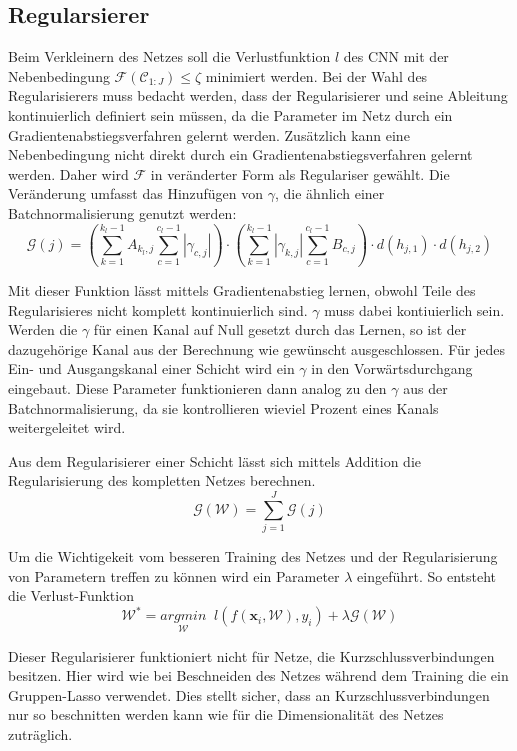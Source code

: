 \subsection{Regularsierer}
Beim Verkleinern des Netzes soll die Verlustfunktion $l$ des CNN mit der Nebenbedingung $\mathcal{F}(\mathcal{C}_{1:J})\leq \zeta$ minimiert werden. Bei der Wahl des Regularisierers muss bedacht werden, dass der Regularisierer und seine Ableitung kontinuierlich definiert sein müssen, da die Parameter im Netz durch ein Gradientenabstiegsverfahren gelernt werden. Zusätzlich kann eine Nebenbedingung nicht direkt durch ein Gradientenabstiegsverfahren gelernt werden. Daher wird $\mathcal{F}$ in veränderter Form als Regulariser gewählt. Die Veränderung umfasst das Hinzufügen von $\gamma$, die ähnlich einer Batchnormalisierung genutzt werden:
\begin{equation}
\mathcal{G}(j)=\left(\sum_{k=1}^{k_l-1} A_{k_l,j} \sum_{c=1}^{c_l-1} |\gamma_{c, j} | \right) \cdot \left(\sum_{k=1}^{k_l-1} |\gamma_{k,j} |   \sum_{c=1}^{c_l-1} B_{c,j}\right) \cdot d(h_{j,1}) \cdot d(h_{j,2})  
\end{equation}

Mit dieser Funktion lässt mittels Gradientenabstieg lernen, obwohl Teile des Regularisieres nicht komplett kontinuierlich sind. $\gamma$ muss dabei kontiuierlich sein. Werden die $\gamma$ für einen Kanal auf Null gesetzt durch das Lernen, so ist der dazugehörige Kanal aus der Berechnung wie gewünscht ausgeschlossen. Für jedes Ein- und Ausgangskanal einer Schicht wird ein $\gamma$ in den Vorwärtsdurchgang eingebaut. Diese Parameter funktionieren dann analog zu den $\gamma$ aus der Batchnormalisierung, da sie kontrollieren wieviel Prozent eines Kanals weitergeleitet wird.


Aus dem Regularisierer einer Schicht lässt sich mittels Addition die Regularisierung des kompletten Netzes berechnen.
\begin{equation}
 \mathcal{G}(\mathcal{W})=\sum_{j=1}^{J} \mathcal{G}(j)
\end{equation}


Um die Wichtigekeit vom besseren Training des Netzes und der Regularisierung von Parametern treffen zu können wird ein Parameter $\lambda$ eingeführt. So entsteht die Verlust-Funktion
\begin{equation}
 \mathcal{W}^{\ast}=\underset{\mathcal{W}}{arg min}\; \; l(f(\mathbf{x}_i, \mathcal{W}),y_i) + \lambda \mathcal{G}(\mathcal{W})
\end{equation}



Dieser Regularisierer funktioniert nicht für Netze, die Kurzschlussverbindungen besitzen. Hier wird wie bei Beschneiden des Netzes während dem Training die ein Gruppen-Lasso verwendet. Dies stellt sicher, dass an Kurzschlussverbindungen nur so beschnitten werden kann wie für die Dimensionalität des Netzes zuträglich.






